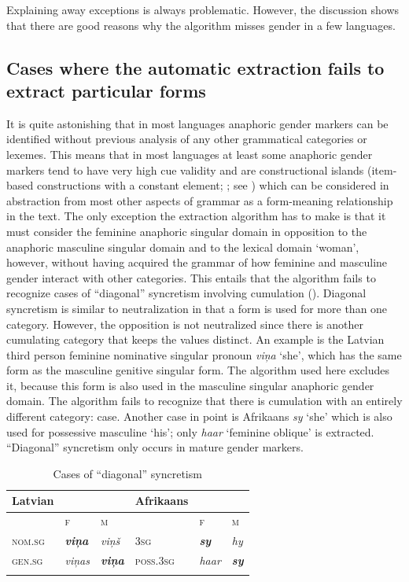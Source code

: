 \documentclass[output=collectionpaper]{langsci/langscibook}
\begin{document}
Explaining away exceptions is always problematic. However, the discussion shows that there are good reasons why the algorithm misses gender in a few languages.

\subsection{Cases where the automatic extraction fails to extract particular forms}
\label{sec:BW:3.6}

It is quite astonishing that in most languages anaphoric gender markers can be identified without previous analysis of any other grammatical categories or lexemes. This means that in most languages at least some anaphoric gender markers tend to have very high cue validity and are constructional islands (item-based constructions with a constant element; \citealt{Tomasello2003}; see ) which can be considered in abstraction from most other aspects of grammar as a form-meaning relationship in the text. The only exception the extraction algorithm has to make is that it must consider the feminine anaphoric singular domain in opposition to the anaphoric masculine singular domain and to the lexical domain ‘woman’, however, without having acquired the grammar of how feminine and masculine gender interact with other categories. This entails that the algorithm fails to recognize cases of “diagonal” syncretism involving cumulation (). Diagonal syncretism is similar to neutralization in that a form is used for more than one category. However, the opposition is not neutralized since there is another cumulating category that keeps the values distinct. An example is the Latvian third person feminine nominative singular pronoun \textit{viņa} ‘she’, which has the same form as the masculine genitive singular form. The algorithm used here excludes it, because this form is also used in the masculine singular anaphoric gender domain. The algorithm fails to recognize that there is cumulation with an entirely different category: case. Another case in point is Afrikaans \textit{sy} ‘she’ which is also used for possessive masculine ‘his’; only \textit{haar} ‘feminine oblique’ is extracted. “Diagonal” syncretism only occurs in mature gender markers.

\begin{table}
\begin{tabular}{llllll}
\lsptoprule
Latvian	&		&		&	Afrikaans	&		&		\\
\midrule
	&	\scshape f	&	\scshape m	&		&	\scshape f	&	\scshape m	\\
\scshape nom.sg	&	\bfseries\itshape viņa	&	\itshape viņš	&	\scshape 3sg	&	\bfseries\itshape sy	&	\itshape hy	\\
\scshape gen.sg	&	\itshape viņas	&	\bfseries\itshape viņa	&	\scshape poss.3sg	&	\itshape haar	&	\bfseries\itshape sy	\\
\lspbottomrule
\end{tabular}
\caption{Cases of “diagonal” syncretism}
\label{tab:BW:4}
\end{table}
\end{document}
